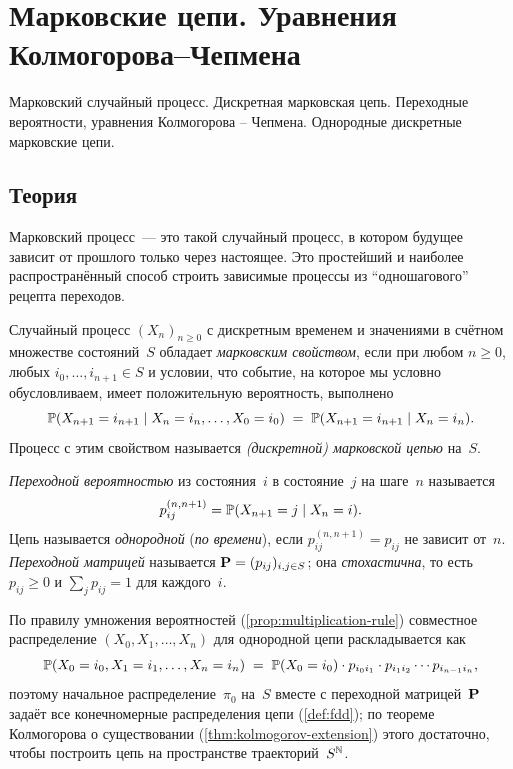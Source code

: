 
\section{Марковские цепи. Уравнения Колмогорова–Чепмена}
\label{sec:1.2.09-markov-chains}

\begin{ticket}
Марковский случайный процесс. Дискретная марковская цепь. Переходные вероятности, уравнения Колмогорова – Чепмена. Однородные дискретные марковские цепи.
\end{ticket}

\subsection*{Теория}

Марковский процесс~--- это такой случайный процесс, в котором будущее зависит от прошлого только через настоящее. Это простейший и наиболее распространённый способ строить зависимые процессы из ``одношагового'' рецепта переходов.

\begin{definition}
\label{def:markov-property}
Случайный процесс $(X_n)_{n \geq 0}$ с дискретным временем и значениями в счётном множестве состояний~$S$ обладает \emph{марковским свойством}, если при любом $n \geq 0$, любых $i_0, \dots, i_{n+1} \in S$ и условии, что событие, на которое мы условно обусловливаем, имеет положительную вероятность, выполнено
\[
  \mathbb{P}(X_{n+1} = i_{n+1} \mid X_n = i_n, \dots, X_0 = i_0) \;=\; \mathbb{P}(X_{n+1} = i_{n+1} \mid X_n = i_n).
\]
Процесс с этим свойством называется \emph{(дискретной) марковской цепью} на~$S$.
\end{definition}

\begin{definition}
\label{def:transition-probabilities}
\emph{Переходной вероятностью} из состояния~$i$ в состояние~$j$ на шаге~$n$ называется
\[
  p_{ij}^{(n,n+1)} = \mathbb{P}(X_{n+1} = j \mid X_n = i).
\]
Цепь называется \emph{однородной} (\emph{по времени}), если $p_{ij}^{(n,n+1)} = p_{ij}$ не зависит от~$n$. \emph{Переходной матрицей} называется $\mathbf{P} = (p_{ij})_{i, j \in S}$; она \emph{стохастична}, то есть $p_{ij} \geq 0$ и $\sum_j p_{ij} = 1$ для каждого~$i$.
\end{definition}

По правилу умножения вероятностей (\cref{prop:multiplication-rule}) совместное распределение $(X_0, X_1, \dots, X_n)$ для однородной цепи раскладывается как
\[
  \mathbb{P}(X_0 = i_0, X_1 = i_1, \dots, X_n = i_n) \;=\; \mathbb{P}(X_0 = i_0) \cdot p_{i_0 i_1} \cdot p_{i_1 i_2} \cdots p_{i_{n-1} i_n},
\]
поэтому начальное распределение~$\pi_0$ на~$S$ вместе с переходной матрицей~$\mathbf{P}$ задаёт все конечномерные распределения цепи (\cref{def:fdd}); по теореме Колмогорова о существовании (\cref{thm:kolmogorov-extension}) этого достаточно, чтобы построить цепь на пространстве траекторий~$S^{\mathbb{N}}$.

